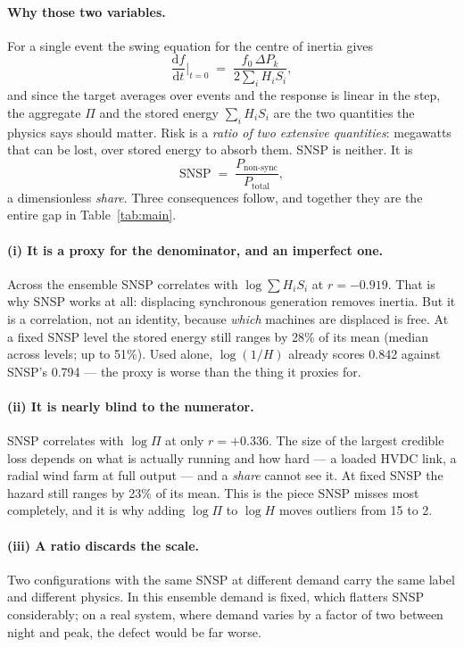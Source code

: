 \documentclass[11pt,a4paper]{article}
\begin{document}
\paragraph{Why those two variables.} For a single event the swing equation
for the centre of inertia gives
\begin{equation}
\frac{\mathrm{d}f}{\mathrm{d}t}\Big|_{t=0} \;=\; \frac{f_0\,\Delta P_k}{2\sum_i H_i S_i},
\label{eq:swing}
\end{equation}
and since the target averages over events and the response is linear in the
step, the aggregate $\Pi$ and the stored energy $\sum_i H_iS_i$ are the two
quantities the physics says should matter. Risk is a \emph{ratio of two
extensive quantities}: megawatts that can be lost, over stored energy to
absorb them. SNSP is neither. It is
\begin{equation}
\mathrm{SNSP} \;=\; \frac{P_{\text{non-sync}}}{P_{\text{total}}},
\end{equation}
a dimensionless \emph{share}. Three consequences follow, and together they
are the entire gap in Table~\ref{tab:main}.

\paragraph{(i) It is a proxy for the denominator, and an imperfect one.}
Across the ensemble SNSP correlates with $\log\sum H_i S_i$ at $r=-0.919$.
That is why SNSP works at all: displacing synchronous generation removes
inertia. But it is a correlation, not an identity, because \emph{which}
machines are displaced is free. At a fixed SNSP level the stored energy
still ranges by 28\% of its mean (median across levels; up to 51\%). Used
alone, $\log(1/H)$ already scores 0.842 against SNSP's 0.794 --- the proxy is
worse than the thing it proxies for.

\paragraph{(ii) It is nearly blind to the numerator.} SNSP correlates with
$\log \Pi$ at only $r=+0.336$. The size of the largest credible loss
depends on what is actually running and how hard --- a loaded HVDC link, a
radial wind farm at full output --- and a \emph{share} cannot see it. At
fixed SNSP the hazard still ranges by 23\% of its mean. This is the piece
SNSP misses most completely, and it is why adding $\log \Pi$ to $\log H$
moves outliers from 15 to 2.

\paragraph{(iii) A ratio discards the scale.} Two configurations with the
same SNSP at different demand carry the same label and different physics. In
this ensemble demand is fixed, which flatters SNSP considerably; on a real
system, where demand varies by a factor of two between night and peak, the
defect would be far worse.
\end{document}
